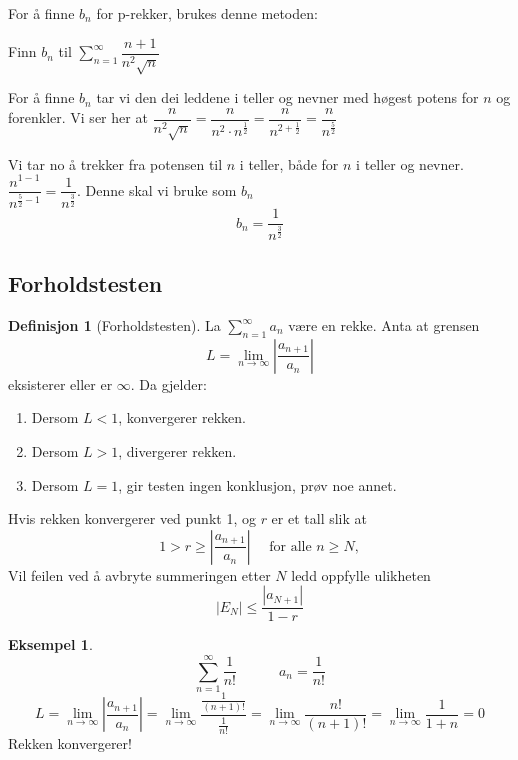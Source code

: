 \documentclass[11pt]{article}
\theoremstyle{definition}
\newtheorem{mindef}{Definisjon}[section]
\newenvironment{fmindef}
{\begin{mdframed}[style=minstil]\begin{mindef}}
		{\end{mindef}\end{mdframed}}
\theoremstyle{definition}
\newtheorem{mitteks}{Eksempel}[section]
\theoremstyle{definition}
\theoremstyle{definition}
\theoremstyle{definition}
\theoremstyle{definition}
\begin{document}
		 For å finne \(b_n\) for p-rekker, brukes denne metoden:
		 
		 Finn \(b_n\) til \(\displaystyle{\sum_{n=1}^{\infty}\dfrac{n+1}{n^2\sqrt{n}}}\)
		 
		 For å finne \(b_n\) tar vi den dei leddene i teller og nevner med høgest potens for \(n\) og  forenkler. Vi ser her at \(\dfrac{n}{n^2\sqrt{n}} = \dfrac{n}{n^2\cdot n^{\frac{1}{2}}} = \dfrac{n}{n^{2+\frac{1}{2}}}=\dfrac{n}{ n^{\frac{5}{2}}}\)
		 
		 Vi tar no å trekker fra potensen til \(n\) i teller, både for \(n\) i teller og nevner. \(\dfrac{n^{1-1}}{n^{\frac{5}{2}-1}}=\dfrac{1}{n^{\frac{3}{2}}}\). Denne skal vi bruke som \(b_n\)
		 \[b_n=\dfrac{1}{n^{\frac{3}{2}}} \]
		 
		 
		 \newpage
		 
		 \subsection{Forholdstesten}
		 		
		 \begin{fmindef}[Forholdstesten]
		 	La \(\displaystyle{\sum_{n=1}^{\infty}a_n}\) være en rekke. Anta at grensen
		 	\[L=\lim_{n \rightarrow \infty}\left| \dfrac{a_{n+1}}{a_n} \right| \]
			eksisterer eller er \(\infty \). Da gjelder:
			\begin{enumerate}	 					\item Dersom \(L<1\), konvergerer    rekken.
		 	\item Dersom \(L>1\), divergerer rekken.
			\item Dersom \(L=1\), gir testen ingen konklusjon, prøv noe annet.
			\end{enumerate}
		 	Hvis rekken konvergerer ved punkt 1, og \(r\) er et tall slik at 
			\[1>r\geq \left| \dfrac{a_{n+1}}{a_n} \right|\hspace{16pt}\text{for alle }n\geq N, \]
		 	Vil feilen ved å avbryte summeringen etter \(N\) ledd oppfylle ulikheten
			\[|E_N|\leq \dfrac{|a_{N+1}|}{1-r} \]
		\end{fmindef}
		 
		 \begin{mitteks}
		 	\[\sum_{n=1}^{\infty}\dfrac{1}{n!}\hspace{36pt}a_n=\dfrac{1}{n!} \]
		 	\[L=\lim_{n \rightarrow \infty}\left| \dfrac{a_{n+1}}{a_n} \right|=\lim_{n \rightarrow \infty}\dfrac{\frac{1}{(n+1)!}}{\frac{1}{n!}}=\lim_{n \rightarrow \infty}\dfrac{n!}{(n+1)!}=\lim_{n \rightarrow \infty}\dfrac{1}{1+n}=0\]	
			Rekken konvergerer!
		 \end{mitteks}
		 		
\end{document}
